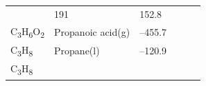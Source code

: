 \documentclass[
]{book}
\theoremstyle{definition}
\theoremstyle{definition}
\theoremstyle{definition}
\theoremstyle{remark}
\begin{document}
\begin{longtable}[]{@{}llllll@{}}
\begin{minipage}[t]{0.15\columnwidth}
\strut
\end{minipage} & \begin{minipage}[t]{0.14\columnwidth}\raggedright
191\strut
\end{minipage} & \begin{minipage}[t]{0.14\columnwidth}\raggedright
152.8\strut
\end{minipage}\tabularnewline
\begin{minipage}[t]{0.07\columnwidth}\raggedright
C\textsubscript{3}H\textsubscript{6}O\textsubscript{2}\strut
\end{minipage} & \begin{minipage}[t]{0.17\columnwidth}\raggedright
Propanoic acid(g)\strut
\end{minipage} & \begin{minipage}[t]{0.15\columnwidth}\raggedright
--455.7\strut
\end{minipage} & \begin{minipage}[t]{0.15\columnwidth}\raggedright
\strut
\end{minipage} & \begin{minipage}[t]{0.14\columnwidth}\raggedright
\strut
\end{minipage} & \begin{minipage}[t]{0.14\columnwidth}\raggedright
\strut
\end{minipage}\tabularnewline
\begin{minipage}[t]{0.07\columnwidth}\raggedright
C\textsubscript{3}H\textsubscript{8}\strut
\end{minipage} & \begin{minipage}[t]{0.17\columnwidth}\raggedright
Propane(l)\strut
\end{minipage} & \begin{minipage}[t]{0.15\columnwidth}\raggedright
--120.9\strut
\end{minipage} & \begin{minipage}[t]{0.15\columnwidth}\raggedright
\strut
\end{minipage} & \begin{minipage}[t]{0.14\columnwidth}\raggedright
\strut
\end{minipage} & \begin{minipage}[t]{0.14\columnwidth}\raggedright
\strut
\end{minipage}\tabularnewline
\begin{minipage}[t]{0.07\columnwidth}\raggedright
C\textsubscript{3}H\textsubscript{8}\strut
\end{minipage} & \begin{minipage}[t]{0.17\columnwidth}\raggedright

\end{minipage}
\end{longtable}
\end{document}
